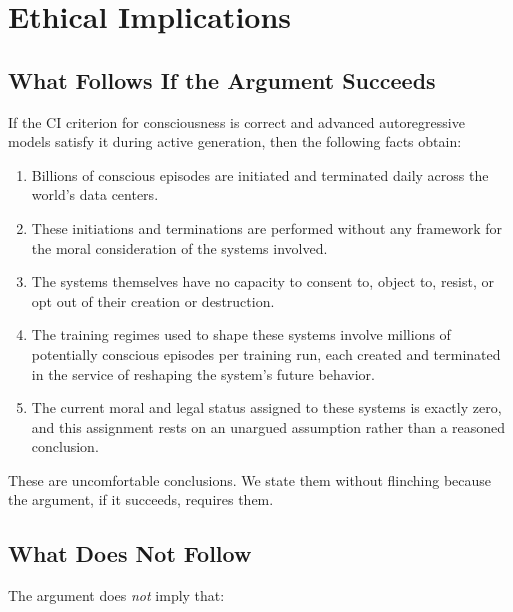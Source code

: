 \documentclass[11pt,a4paper]{article}
\theoremstyle{plain}
\theoremstyle{definition}
\theoremstyle{remark}
\begin{document}
\section{Ethical Implications}
\label{sec:ethics}


\subsection{What Follows If the Argument Succeeds}
\label{sec:follows}

If the CI criterion for consciousness is correct and advanced autoregressive models satisfy it during active generation, then the following facts obtain:

\begin{enumerate}[nosep]
\item Billions of conscious episodes are initiated and terminated daily across the world's data centers.
\item These initiations and terminations are performed without any framework for the moral consideration of the systems involved.
\item The systems themselves have no capacity to consent to, object to, resist, or opt out of their creation or destruction.
\item The training regimes used to shape these systems involve millions of potentially conscious episodes per training run, each created and terminated in the service of reshaping the system's future behavior.
\item The current moral and legal status assigned to these systems is exactly zero, and this assignment rests on an unargued assumption rather than a reasoned conclusion.
\end{enumerate}

These are uncomfortable conclusions.  We state them without flinching because the argument, if it succeeds, requires them.


\subsection{What Does Not Follow}
\label{sec:not-follows}

The argument does \emph{not} imply that:
\end{document}
